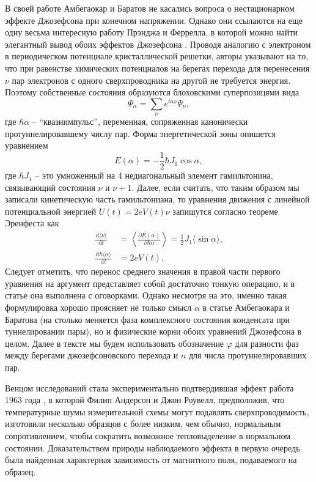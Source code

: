 \documentclass[14pt, a4paper]{extreport}
\newcommand{\diff}{\,\mathrm{d}}
\numberwithin{equation}{section}
\begin{document}
В своей работе Амбегаокар и Баратов не касались вопроса о нестационарном эффекте Джозефсона при конечном напряжении. Однако они ссылаются на еще одну весьма интересную работу Прэнджа и Феррелла, в которой можно найти элегантный вывод обоих эффектов Джозефсона \cite{ferrell1963self}. Проводя аналогию с электроном в периодическом потенциале кристаллической решетки, авторы указывают на то, что при равенстве химических потенциалов на берегах перехода для перенесения $\nu$ пар электронов с одного сверхпроводника на другой не требуется энергия. Поэтому собственные состояния образуются блоховскими суперпозицями вида
\begin{equation}
	\Psi_\alpha = \sum_\nu e^{i\alpha \nu} \Psi_\nu,
\end{equation}
где $\hbar\alpha$ -- ``квазиимпульс'', переменная, сопряженная канонически протуннелировавшему числу пар. Форма энергетической зоны опишется уравнением
\begin{equation}
	E(\alpha) = -\frac{1}{2}\hbar J_1 \cos \alpha,
\end{equation} 
где $\hbar J_1$ -- это умноженный на 4 недиагональный элемент гамильтонина, связывающий состояния $\nu$ и $\nu+1$. Далее, если считать, что таким образом мы записали кинетическую часть гамильтониана, то уравнения движения с линейной потенциальной энергией $U(t) = 2eV(t)\nu$ запишутся согласно теореме Эренфеста как 
\begin{align}
	\frac{\diff \langle \nu \rangle }{\diff t} &=\left\langle \frac{\partial E(\alpha)}{ \partial \hbar\alpha}\right\rangle = \frac{1}{2} J_1 \langle \sin \alpha \rangle,\label{eq:JJ1}\\
	\frac{\diff \hbar\langle  \alpha \rangle}{\diff t} &= 2 e V(t).\label{eq:JJ2}
\end{align}
Следует отметить, что перенос среднего значения в правой части первого уравнения на аргумент представляет собой достаточно тонкую операцию, и в статье она выполнена с оговорками. Однако несмотря на это, именно такая формулировка хорошо проясняет не только смысл $\alpha$ в статье Амбегаокара и Баратова (на столько меняется фаза комплексного состояния конденсата при туннелировании пары), но и физические корни обоих уравнений Джозефсона в целом. Далее в тексте мы будем использовать обозначение $\varphi$ для разности фаз между берегами джозефсоновского перехода и $n$ для числа протуннелировавших пар.

Венцом исследований стала экспериментально подтвердившая эффект работа 1963 года \cite{anderson1963probable}, в которой Филип Андерсон и Джон Роувелл, предположив, что температурные шумы измерительной схемы могут подавлять сверхпроводимость, изготовили несколько образцов с более низким, чем обычно, нормальным сопротивлением, чтобы сократить возможное тепловыделение в нормальном состоянии. Доказательством природы наблюдаемого эффекта в первую очередь была найденная характерная зависимость от магнитного поля, подаваемого на образец.
\end{document}
